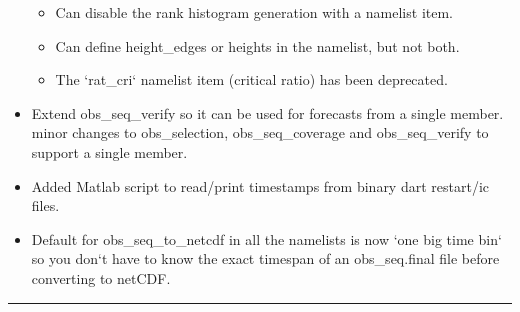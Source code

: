 \documentclass[letterpaper,10pt,english]{sphinxmanual}
\begin{document}
\begin{itemize}
\begin{itemize}
\item {} 
Can disable the rank histogram generation with a namelist item.

\item {} 
Can define height\_edges or heights in the namelist, but not
both.

\item {} 
The `rat\_cri` namelist item (critical ratio) has been
deprecated.

\end{itemize}

\item {} 
Extend obs\_seq\_verify so it can be used for forecasts from a
single member. minor changes to obs\_selection, obs\_seq\_coverage
and obs\_seq\_verify to support a single member.

\item {} 
Added Matlab script to read/print timestamps from binary dart
restart/ic files.

\item {} 
Default for obs\_seq\_to\_netcdf in all the namelists is now `one
big time bin` so you don`t have to know the exact timespan of an
obs\_seq.final file before converting to netCDF.

\end{itemize}


\bigskip\hrule{}\bigskip
\end{document}
